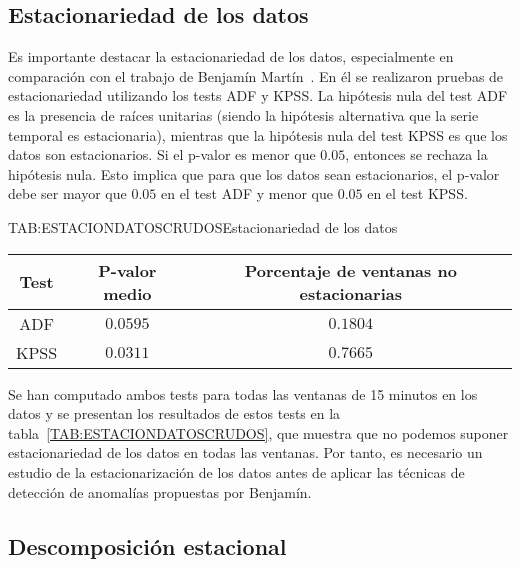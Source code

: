 
\subsection{Estacionariedad de los datos}\label{SUBSEC:ESTACIONARIEDAD}

Es importante destacar la estacionariedad de los datos, especialmente en comparación con el trabajo de Benjamín Martín~\cite{benjamin2023}. En él se realizaron pruebas de estacionariedad utilizando los tests \ac{ADF} y \ac{KPSS}. La hipótesis nula del test ADF es la presencia de raíces unitarias (siendo la hipótesis alternativa que la serie temporal es estacionaria), mientras que la hipótesis nula del test KPSS es que los datos son estacionarios. Si el p-valor es menor que $0.05$, entonces se rechaza la hipótesis nula. Esto implica que para que los datos sean estacionarios, el p-valor debe ser mayor que $0.05$ en el test ADF y menor que $0.05$ en el test KPSS.

\begin{table}[Estacionariedad de los datos]{TAB:ESTACIONDATOSCRUDOS}{Estacionariedad de los datos}
    \begin{tabular}{|c|c|c|}
        \hline
        \textbf{Test} & \textbf{P-valor medio} & \textbf{Porcentaje de ventanas no estacionarias} \\
        \hline
        ADF & $0.0595$ & $0.1804$ \\
        KPSS & $0.0311$ & $0.7665$ \\
        \hline
    \end{tabular}
\end{table}

Se han computado ambos tests para todas las ventanas de 15 minutos en los datos y se presentan los resultados de estos tests en la tabla~\ref{TAB:ESTACIONDATOSCRUDOS}, que muestra que no podemos suponer estacionariedad de los datos en todas las ventanas. Por tanto, es necesario un estudio de la estacionarización de los datos antes de aplicar las técnicas de detección de anomalías propuestas por Benjamín.

\subsection{Descomposici\'on estacional}\label{SUBSEC:DESESTACIONALIDAD}


